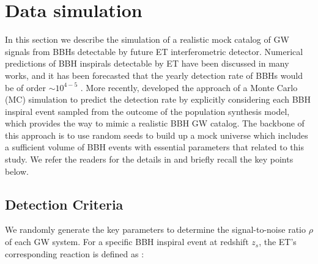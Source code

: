 \documentclass[twocolumn]{aastex62}
\begin{document}
\section{Data simulation} \label{sec_simulation}
In this section we describe the simulation of a realistic mock catalog of GW signals from BBHs detectable by future ET interferometric detector. Numerical predictions of BBH inspirals detectable by ET 
have been discussed in many works, and it has been forecasted that the yearly detection rate of BBHs would be of order $\sim10^{4-5}$ \citep{Abernathy2011, Ola2013, Biesiada2014}. More recently, \citet{Yang2019} developed the approach of a Monte Carlo (MC) simulation to predict the detection rate by explicitly considering each BBH inspiral event sampled from the outcome of the population synthesis model, which provides the way to mimic a realistic BBH GW catalog. The backbone of this approach is to use random seeds to build up a mock universe which includes a sufficient volume of BBH events with essential parameters that related to this study. We refer the readers for the details in \citet[][Section 2, therein]{Yang2019}  and briefly recall the key points below.

\subsection{Detection Criteria} \label{subsec_criteria}
We randomly generate the key parameters to determine the signal-to-noise ratio $\rho$ of each GW system. For a specific BBH inspiral event at redshift $z_s$, the ET's corresponding reaction is defined as \citep{Abernathy2011}:
\end{document}
